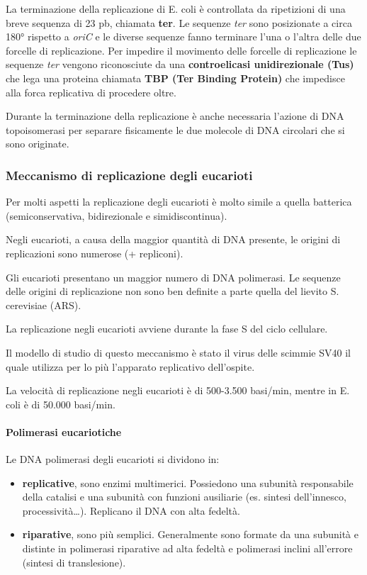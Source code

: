 \documentclass[]{article}
\begin{document}
La terminazione della replicazione di E. coli è controllata da
ripetizioni di una breve sequenza di 23 pb, chiamata \textbf{ter}. Le
sequenze \emph{ter} sono posizionate a circa 180° rispetto a \emph{oriC}
e le diverse sequenze fanno terminare l'una o l'altra delle due forcelle
di replicazione. Per impedire il movimento delle forcelle di
replicazione le sequenze \emph{ter} vengono riconosciute da una
\textbf{controelicasi unidirezionale (Tus)} che lega una proteina
chiamata \textbf{TBP (Ter Binding Protein)} che impedisce alla forca
replicativa di procedere oltre.

Durante la terminazione della replicazione è anche necessaria l'azione
di DNA topoisomerasi per separare fisicamente le due molecole di DNA
circolari che si sono originate.

\subsubsection{Meccanismo di replicazione degli
eucarioti}\label{meccanismo-di-replicazione-degli-eucarioti}

Per molti aspetti la replicazione degli eucarioti è molto simile a
quella batterica (semiconservativa, bidirezionale e simidiscontinua).

Negli eucarioti, a causa della maggior quantità di DNA presente, le
origini di replicazioni sono numerose (+ repliconi).

Gli eucarioti presentano un maggior numero di DNA polimerasi. Le
sequenze delle origini di replicazione non sono ben definite a parte
quella del lievito S. cerevisiae (ARS).

La replicazione negli eucarioti avviene durante la fase S del ciclo
cellulare.

Il modello di studio di questo meccanismo è stato il virus delle scimmie
SV40 il quale utilizza per lo più l'apparato replicativo dell'ospite.

La velocità di replicazione negli eucarioti è di 500-3.500 basi/min,
mentre in E. coli è di 50.000 basi/min.

\paragraph{Polimerasi eucariotiche}\label{polimerasi-eucariotiche}

Le DNA polimerasi degli eucarioti si dividono in:

\begin{itemize}
\itemsep1pt\parskip0pt
\item
  \textbf{replicative}, sono enzimi multimerici. Possiedono una subunità
  responsabile della catalisi e una subunità con funzioni ausiliarie
  (es. sintesi dell'innesco, processività\ldots{}). Replicano il DNA con
  alta fedeltà.
\item
  \textbf{riparative}, sono più semplici. Generalmente sono formate da
  una subunità e distinte in polimerasi riparative ad alta fedeltà e
  polimerasi inclini all'errore (sintesi di translesione).
\end{itemize}
\end{document}
